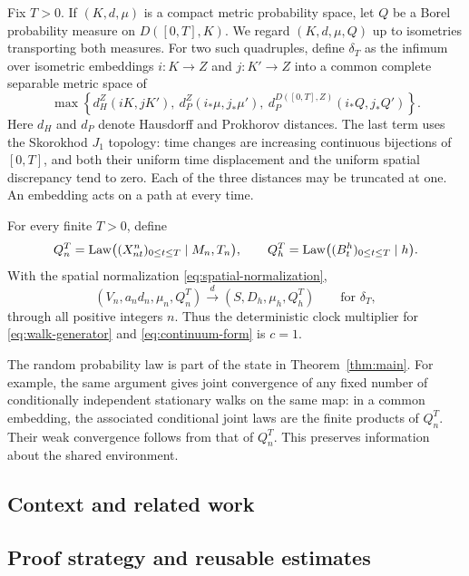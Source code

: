 Fix $T>0$. If $(K,d,\mu)$ is a compact metric probability space, let
$Q$ be a Borel probability measure on $D([0,T],K)$. We regard
$(K,d,\mu,Q)$ up to isometries transporting both measures. For two such
quadruples, define $\delta_T$ as the infimum over isometric embeddings
$i:K\to Z$ and $j:K'\to Z$ into a common complete separable metric space
of
\begin{equation}\label{eq:delta}
 \max\left\{
 d_H^Z(iK,jK'),\ d_P^Z(i_*\mu,j_*\mu'),\
 d_P^{D([0,T],Z)}(i_*Q,j_*Q')\right\}.
\end{equation}
Here $d_H$ and $d_P$ denote Hausdorff and Prokhorov distances. The last
term uses the Skorokhod $J_1$ topology: time changes are increasing
continuous bijections of $[0,T]$, and both their uniform time displacement
and the uniform spatial discrepancy tend to zero. Each of the three
distances may be truncated at one. An embedding acts on a path at every
time.

\begin{samepage}
\begin{theorem}\label{thm:main}
For every finite $T>0$, define
\[
 Q_n^T=\operatorname{Law}\bigl((X^n_{nt})_{0\le t\le T}\mid M_n,T_n\bigr),
 \qquad
 Q_h^T=\operatorname{Law}\bigl((B^h_t)_{0\le t\le T}\mid h\bigr).
\]
With the spatial normalization \eqref{eq:spatial-normalization},
\[
 (V_n,a_nd_n,\mu_n,Q_n^T)
       \xrightarrow{\ d\ }(S,D_h,\mu_h,Q_h^T)
       \qquad\text{for }\delta_T,
\]
through all positive integers $n$. Thus the deterministic clock
multiplier for \eqref{eq:walk-generator} and \eqref{eq:continuum-form}
is $c=1$.
\end{theorem}
\end{samepage}

The random probability law is part of the state in Theorem~\ref{thm:main}.
For example, the same argument gives joint convergence of any fixed
number of conditionally independent stationary walks on the same map:
in a common embedding, the associated conditional joint laws are the
finite products of $Q_n^T$. Their weak convergence follows from that of
$Q_n^T$. This preserves information about the shared environment.

\subsection{Context and related work}


\subsection{Proof strategy and reusable estimates}

